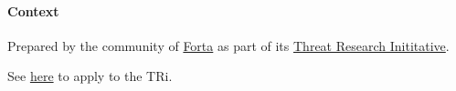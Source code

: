 \paragraph{Context} \label{sec:context}

Prepared by the community of \href{https://forta.org/}{Forta} as part of its \href{https://forta.org/blog/investing-in-applied-academic-threat-research/}{Threat Research Inititative}.

See \href{http://forta.org/join-tri}{here} to apply to the TRi.
